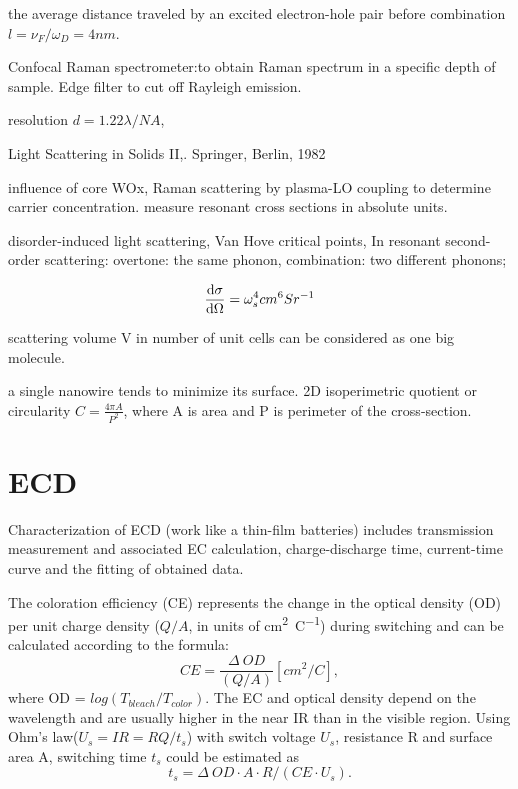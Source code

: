 the average distance traveled by an excited electron-hole pair before combination $l=\nu_F/\omega_D=4nm$.

Confocal Raman spectrometer:to obtain Raman spectrum in a specific depth of sample. Edge filter to cut off Rayleigh emission.


resolution $d= 1.22 \lambda/NA$,

Light Scattering in Solids II,. Springer, Berlin, 1982

influence of core WOx, Raman scattering by plasma-LO coupling to determine carrier concentration. measure resonant cross sections in absolute units.

disorder-induced light scattering, Van Hove critical points,
In resonant second-order scattering:
overtone: the same phonon,
combination: two different phonons;

\[
\frac{\mathrm{d}\sigma}{\mathrm{d}\Omega}= \omega_s^4 cm^6 Sr^{-1}
\]

scattering volume V in number of unit cells can be considered as one big molecule.


a single nanowire tends to minimize its surface. 2D isoperimetric quotient or circularity $C= \frac{4\pi A}{P^2}$, where A is area and P is perimeter of the cross-section.




\section{ECD}


Characterization of ECD (work like a thin-film batteries) includes transmission measurement and associated EC calculation, charge-discharge time, current-time curve and the fitting of obtained data.

The coloration efficiency (CE) represents the change in the optical density (OD) per unit charge density ($Q/A$, in units of \si{\cm^2\per\coulomb}) during switching and can be calculated according to the formula:
\begin{equation}
CE = \frac{\Delta~OD}{(Q/A)} [cm^2/C],
\end{equation}
where OD = $log(T_{bleach}/T_{color})$. The EC and optical density depend on the wavelength and are usually higher in the near IR than in the visible region.
Using Ohm's law($U_s = IR = RQ/t_s$) with switch voltage $U_s$, resistance R and surface area A, switching time $t_s$ could be estimated as
\begin{equation}
t_s = \Delta~OD\cdot A \cdot R /(CE\cdot U_s).
\end{equation}



